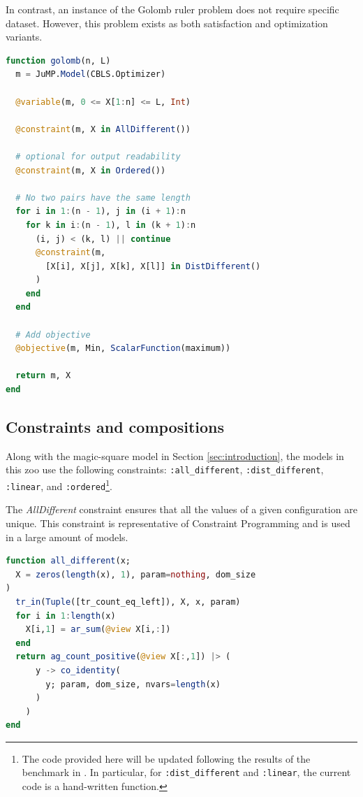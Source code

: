 \documentclass{juliacon}
\begin{document}
In contrast, an instance of the Golomb ruler problem does not require specific dataset. However, this problem exists as both satisfaction and optimization variants.

\begin{lstlisting}[language = Julia]
function golomb(n, L)
  m = JuMP.Model(CBLS.Optimizer)

  @variable(m, 0 <= X[1:n] <= L, Int)

  @constraint(m, X in AllDifferent())

  # optional for output readability
  @constraint(m, X in Ordered())

  # No two pairs have the same length
  for i in 1:(n - 1), j in (i + 1):n
    for k in i:(n - 1), l in (k + 1):n
      (i, j) < (k, l) || continue
      @constraint(m,
        [X[i], X[j], X[k], X[l]] in DistDifferent()
      )
    end
  end

  # Add objective
  @objective(m, Min, ScalarFunction(maximum))

  return m, X
end
\end{lstlisting}

\subsection{Constraints and compositions}
\label{subsec:constraints}

Along with the magic-square model in Section \ref{sec:introduction}, the models in this zoo use the following constraints: \texttt{:all\_different}, \texttt{:dist\_different}, \texttt{:linear}, and \texttt{:ordered}\footnote{The code provided here will be updated following the results of the benchmark in \cite{baffier2022interpretable}. In particular, for \texttt{:dist\_different} and \texttt{:linear}, the current code is a hand-written function.}.\newline

The \emph{AllDifferent} constraint ensures that all the values of a given configuration are unique. This constraint is representative of Constraint Programming and is used in a large amount of models.

\begin{lstlisting}[language = Julia]
function all_different(x;
  X = zeros(length(x), 1), param=nothing, dom_size
)
  tr_in(Tuple([tr_count_eq_left]), X, x, param)
  for i in 1:length(x)
    X[i,1] = ar_sum(@view X[i,:])
  end
  return ag_count_positive(@view X[:,1]) |> (
      y -> co_identity(
        y; param, dom_size, nvars=length(x)
      )
    )
end
\end{lstlisting}
\end{document}
